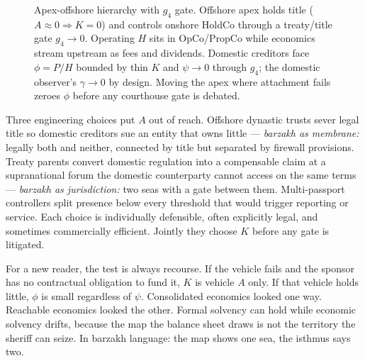 \begin{figure}[h]
\caption{Apex-offshore hierarchy with $g_4$ gate. Offshore apex holds title ($A\approx0\Rightarrow K=0$) and controls onshore HoldCo through a treaty/title gate $g_4\to0$. Operating $H$ sits in OpCo/PropCo while economics stream upstream as fees and dividends. Domestic creditors face $\phi=P/H$ bounded by thin $K$ and $\psi\to0$ through $g_4$; the domestic observer's $\gamma\to0$ by design. Moving the apex where attachment fails zeroes $\phi$ before any courthouse gate is debated.}
\label{fig:hierarchy-ch7}
\end{figure}

Three engineering choices put $A$ out of reach. Offshore dynastic trusts sever legal title so domestic creditors sue an entity that owns little --- \textit{barzakh as membrane:} legally both and neither, connected by title but separated by firewall provisions. Treaty parents convert domestic regulation into a compensable claim at a supranational forum the domestic counterparty cannot access on the same terms --- \textit{barzakh as jurisdiction:} two seas with a gate between them. Multi-passport controllers split presence below every threshold that would trigger reporting or service. Each choice is individually defensible, often explicitly legal, and sometimes commercially efficient. Jointly they choose $K$ before any gate is litigated.

For a new reader, the test is always recourse. If the vehicle fails and the sponsor has no contractual obligation to fund it, $K$ is vehicle $A$ only. If that vehicle holds little, $\phi$ is small regardless of $\psi$. Consolidated economics looked one way. Reachable economics looked the other. Formal solvency can hold while economic solvency drifts, because the map the balance sheet draws is not the territory the sheriff can seize. In barzakh language: the map shows one sea, the isthmus says two.

